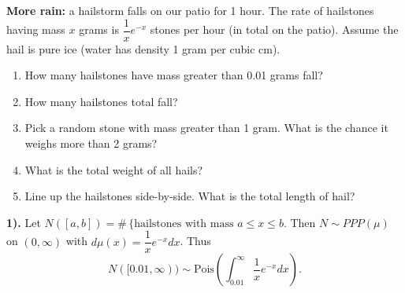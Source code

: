 \documentclass[../../../Master/AppliedStochastics.tex]{subfiles}
\author{Nathan Hunter}
\date{12 October 2018}
\begin{document}
%


\makelecture


%
%
%
%


\textbf{More rain:} a hailstorm falls on our patio for 1 hour. The rate of hailstones having mass $x$ grams is $\dfrac{1}{x}e^{-x}$ stones per hour (in total on the patio). Assume the hail is pure ice (water has density 1 gram per cubic cm).

\begin{enumerate}
\item How many hailstones have mass greater than 0.01 grams fall?

\item How many hailstones total fall?

\item Pick a random stone with mass greater than 1 gram. What is the chance it weighs more than 2 grams?

\item What is the total weight of all hails?

\item Line up the hailstones side-by-side. What is the total length of hail?
\end{enumerate}

\textbf{1).} Let $N([a,b])=\#\,\{\textrm{hailstones with mass $a\leq x\leq b$}$. Then $N\sim PPP(\mu)$ on $(0,\infty)$ with $d\mu(x)=\dfrac{1}{x}e^{-x}dx$. Thus
$$N([0.01,\infty))\sim\textrm{Pois}\left( \int_{0.01}^\infty \frac{1}{x}e^{-x}dx\right).$$
\end{document}
